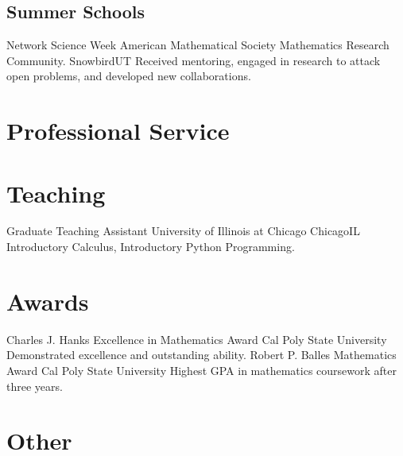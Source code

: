       \subsection{Summer Schools}
               {Network Science Week}
               {American Mathematical Society Mathematics Research Community.}
               {Snowbird}{UT}
               {Received mentoring, engaged in research to attack open problems, and developed new collaborations.}
      

  \section{Professional Service} 
   

  \section{Teaching}
            {Graduate Teaching Assistant}
            {University of Illinois at Chicago}
            {Chicago}{IL}
            {Introductory Calculus, Introductory Python Programming.}

  \section{Awards}
               {Charles J. Hanks Excellence in Mathematics Award}
               {Cal Poly State University}
               {}{}{Demonstrated excellence and outstanding ability.}
               {Robert P. Balles Mathematics Award}
               {Cal Poly State University}
               {}{}{Highest GPA in mathematics coursework after three years.}


   \section{Other}


